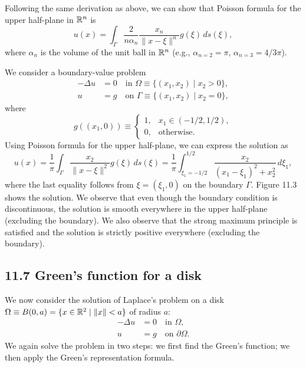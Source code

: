 \begin{nremark}
    Following the same derivation as above, we can show that Poisson formula for the upper half-plane in $\mathbb{R}^n$ is
    \[u(x) = \int_\Gamma \frac{2}{n\alpha_n}\frac{x_n}{\|x - \xi\|^n}g(\xi)\,ds(\xi),\]
    where $\alpha_n$ is the volume of the unit ball in $\mathbb{R}^n$ (e.g., $\alpha_{n=2} = \pi$, $\alpha_{n=3} = 4/3\pi$).
\end{nremark}

\begin{example}
    We consider a boundary-value problem
    \begin{align*}
        -\Delta u &= 0 \quad \text{in } \Omega \equiv \{(x_1, x_2) \mid x_2 > 0\}, \\
        u &= g \quad \text{on } \Gamma \equiv \{(x_1, x_2) \mid x_2 = 0\},
    \end{align*}
    where
    \[g((x_1, 0)) \equiv \begin{cases} 1, & x_1 \in (-1/2, 1/2), \\ 0, & \text{otherwise}. \end{cases}\]
    Using Poisson formula for the upper half-plane, we can express the solution as
    \[u(x) = \frac{1}{\pi}\int_\Gamma \frac{x_2}{\|x - \xi\|^2}g(\xi)\,ds(\xi) = \frac{1}{\pi}\int_{\xi_1=-1/2}^{1/2} \frac{x_2}{(x_1 - \xi_1)^2 + x_2^2}\,d\xi_1,\]
    where the last equality follows from $\xi = (\xi_1, 0)$ on the boundary $\Gamma$. Figure 11.3 shows the solution. We observe that even though the boundary condition is discontinuous, the solution is smooth everywhere in the upper half-plane (excluding the boundary). We also observe that the strong maximum principle is satisfied and the solution is strictly positive everywhere (excluding the boundary).

\end{example}

\subsection{11.7 Green's function for a disk}
We now consider the solution of Laplace's problem on a disk $\Omega \equiv B(0, a) = \{x \in \mathbb{R}^2 \mid \|x\| < a\}$ of radius $a$:
\begin{equation*}
    \begin{aligned}
        -\Delta u &= 0 \quad \text{in } \Omega, \\
        u &= g \quad \text{on } \partial\Omega.
    \end{aligned} \tag{11.4}
\end{equation*}
We again solve the problem in two steps: we first find the Green's function; we then apply the Green's representation formula.

